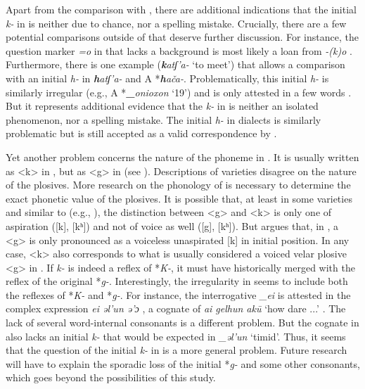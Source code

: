 \documentclass[output=paper,hidelinks]{langscibook}
\begin{document}
Apart from the comparison with , there are additional indications that the initial \textit{k-} in  is neither due to chance, nor a spelling mistake. Crucially, there are a few potential comparisons outside of  that deserve further discussion. For instance, the question marker \textit{=o} in  that lacks a  background is most likely a loan from  \textit{-(k)o} \citep[213]{Hölzl2018b}. Furthermore, there is one example (\textit{\textbf{k}atʃ’a-} `to meet') that allows a comparison with an initial \textit{h-} in  \textit{\textbf{h}atʃ’a-} and  A *\textit{\textbf{h}ača-}. Problematically, this initial \textit{h-} is similarly irregular (e.g.,  A *\textbf{\_}\textit{onioxon} `19') and is only attested in a few words \citep{Kiyose1996,Kiyose2000,Hölzl2017,Hölzltoappear}. But it represents additional evidence that the \textit{k-} in  is neither an isolated phenomenon, nor a spelling mistake. The initial \textit{h-} in  dialects is similarly problematic but is still accepted as a valid correspondence by \citet{Doerfer1973}.

Yet another problem concerns the nature of the phoneme in . It is usually written as <k> in \citet{MuYejun1986}, but as <g> in \citet{MuYejun1987,MuYejun1988} (see ). Descriptions of  varieties disagree on the nature of the plosives. More research on the phonology of  is necessary to determine the exact phonetic value of the plosives. It is possible that, at least in some varieties and similar to  (e.g., \citealt{ZhaoJie1989}), the distinction between <g> and <k> is only one of aspiration ([k], [kʰ]) and not of voice as well ([g], [kʰ]). But \citet[27]{Norman2004/5} argues that, in , a <g> is only pronounced as a voiceless unaspirated [k] in initial position. In any case,  <k> \citep{MuYejun1986} also corresponds to what is usually considered a voiced velar plosive <g> in . If  \textit{k-} is indeed a reflex of  *\textit{K-}, it must have historically merged with the reflex of the original *\textit{g-}. Interestingly, the irregularity in  seems to include both the reflexes of *\textit{K-} and *\textit{g-}. For instance, the interrogative \textit{\_ei} is attested in the complex expression \textit{ei əl'un ə'ɔ} \citep[10]{MuYejun1986}, a cognate of  \textit{ai gelhun akū} `how dare ...' \citep{Norman2013}. The lack of several word-internal consonants is a different problem. But the cognate in  also lacks an initial \textit{k-} that would be expected in \textit{\_əl'un} `timid'. Thus, it seems that the question of the initial \textit{k-} in  is a more general problem. Future research will have to explain the sporadic loss of the initial *\textit{g-} and some other consonants, which goes beyond the possibilities of this study.
\end{document}
